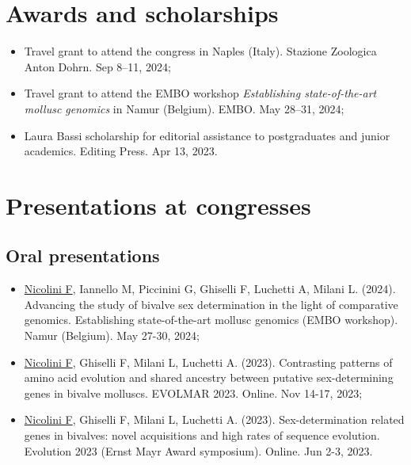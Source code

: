 \section*{Awards and scholarships}
\begin{itemize}
    \item Travel grant to attend the  congress in Naples (Italy). Stazione Zoologica Anton Dohrn. Sep 8--11, 2024;
    \item Travel grant to attend the EMBO workshop \textit{Establishing state-of-the-art mollusc genomics} in Namur (Belgium). EMBO. May 28--31, 2024;
    \item Laura Bassi scholarship for editorial assistance to postgraduates and junior academics. Editing Press. Apr 13, 2023.
\end{itemize}

\section*{Presentations at congresses}
\subsection*{Oral presentations}
\begin{itemize}
    \item \underline{Nicolini F}, Iannello M, Piccinini G, Ghiselli F, Luchetti A, Milani L. (2024). Advancing the study of bivalve sex determination in the light of comparative genomics. Establishing state-of-the-art mollusc genomics (EMBO workshop). Namur (Belgium). May 27-30, 2024;
    \item \underline{Nicolini F}, Ghiselli F, Milani L, Luchetti A. (2023). Contrasting patterns of amino acid evolution and shared ancestry between putative sex-determining genes in bivalve molluscs. EVOLMAR 2023. Online. Nov 14-17, 2023;
    \item \underline{Nicolini F}, Ghiselli F, Milani L, Luchetti A. (2023). Sex-determination related genes in bivalves: novel acquisitions and high rates of sequence evolution. Evolution 2023 (Ernst Mayr Award symposium). Online. Jun 2-3, 2023.
\end{itemize}

